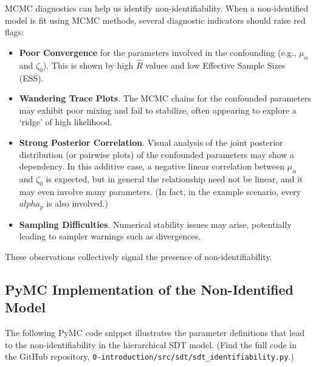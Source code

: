 \documentclass[12pt]{article}
\begin{document}
MCMC diagnostics can help us identify non-identifiability.  When a non-identified model is fit using MCMC methods, several diagnostic indicators should raise red flags:

\begin{itemize}[label=--, itemsep=1ex]
    \item \textbf{Poor Convergence} for the parameters involved in the confounding (e.g., $\mu_\alpha$ and $\zeta_0$). This is shown by high $\hat{R}$ values and low Effective Sample Sizes (ESS).
    \item \textbf{Wandering Trace Plots}. The MCMC chains for the confounded parameters may exhibit poor mixing and fail to stabilize, often appearing to explore a `ridge' of high likelihood.
    \item \textbf{Strong Posterior Correlation}. Visual analysis of the joint posterior distribution (or pairwise plots) of the confounded parameters may show a dependency. In this additive case, a negative linear correlation between $\mu_\alpha$ and $\zeta_0$ is expected, but in general the relationship need not be linear, and it may even involve many parameters. (In fact, in the example scenario, every $alpha_p$ is also involved.)
    \item \textbf{Sampling Difficulties}. Numerical stability issues may arise, potentially leading to sampler warnings such as divergences.
\end{itemize}
These observations collectively signal the presence of non-identifiability.

\subsection*{PyMC Implementation of the Non-Identified Model}

The following PyMC code snippet illustrates the parameter definitions that lead to the non-identifiability in the hierarchical SDT model. (Find the full code in the GitHub repository, \texttt{0-introduction/src/sdt/sdt\_identifiability.py}.)
\end{document}
